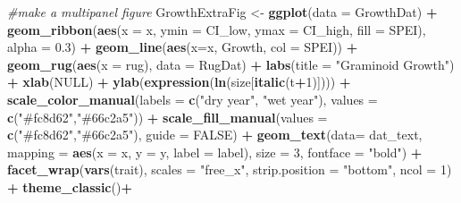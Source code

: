 \documentclass[
]{article}
\newenvironment{Shaded}{\begin{snugshade}}{\end{snugshade}}
\newcommand{\CommentTok}[1]{\textcolor[rgb]{0.56,0.35,0.01}{\textit{#1}}}
\newcommand{\DataTypeTok}[1]{\textcolor[rgb]{0.13,0.29,0.53}{#1}}
\newcommand{\DecValTok}[1]{\textcolor[rgb]{0.00,0.00,0.81}{#1}}
\newcommand{\FloatTok}[1]{\textcolor[rgb]{0.00,0.00,0.81}{#1}}
\newcommand{\KeywordTok}[1]{\textcolor[rgb]{0.13,0.29,0.53}{\textbf{#1}}}
\newcommand{\NormalTok}[1]{#1}
\newcommand{\OperatorTok}[1]{\textcolor[rgb]{0.81,0.36,0.00}{\textbf{#1}}}
\newcommand{\OtherTok}[1]{\textcolor[rgb]{0.56,0.35,0.01}{#1}}
\newcommand{\StringTok}[1]{\textcolor[rgb]{0.31,0.60,0.02}{#1}}
\begin{document}
\begin{Shaded}
\begin{Highlighting}[]
\CommentTok{\#make a multipanel figure}
\NormalTok{GrowthExtraFig \textless{}{-}}\StringTok{ }\KeywordTok{ggplot}\NormalTok{(}\DataTypeTok{data =}\NormalTok{ GrowthDat) }\OperatorTok{+}
\StringTok{  }\KeywordTok{geom\_ribbon}\NormalTok{(}\KeywordTok{aes}\NormalTok{(}\DataTypeTok{x =}\NormalTok{ x, }\DataTypeTok{ymin =}\NormalTok{ CI\_low, }\DataTypeTok{ymax =}\NormalTok{ CI\_high, }\DataTypeTok{fill =}\NormalTok{ SPEI), }\DataTypeTok{alpha =} \FloatTok{0.3}\NormalTok{) }\OperatorTok{+}
\StringTok{  }\KeywordTok{geom\_line}\NormalTok{(}\KeywordTok{aes}\NormalTok{(}\DataTypeTok{x=}\NormalTok{x, Growth, }\DataTypeTok{col =}\NormalTok{ SPEI))  }\OperatorTok{+}\StringTok{ }
\StringTok{  }\KeywordTok{geom\_rug}\NormalTok{(}\KeywordTok{aes}\NormalTok{(}\DataTypeTok{x =}\NormalTok{ rug), }\DataTypeTok{data =}\NormalTok{ RugDat) }\OperatorTok{+}
\StringTok{  }\KeywordTok{labs}\NormalTok{(}\DataTypeTok{title =} \StringTok{"Graminoid Growth"}\NormalTok{) }\OperatorTok{+}
\StringTok{  }\KeywordTok{xlab}\NormalTok{(}\OtherTok{NULL}\NormalTok{) }\OperatorTok{+}
\StringTok{  }\KeywordTok{ylab}\NormalTok{(}\KeywordTok{expression}\NormalTok{(}\KeywordTok{ln}\NormalTok{(size[}\KeywordTok{italic}\NormalTok{(t}\OperatorTok{+}\DecValTok{1}\NormalTok{)])))  }\OperatorTok{+}
\StringTok{  }\KeywordTok{scale\_color\_manual}\NormalTok{(}\DataTypeTok{labels =} \KeywordTok{c}\NormalTok{(}\StringTok{"dry year"}\NormalTok{, }\StringTok{"wet year"}\NormalTok{), }\DataTypeTok{values =} \KeywordTok{c}\NormalTok{(}\StringTok{"\#fc8d62"}\NormalTok{,}\StringTok{"\#66c2a5"}\NormalTok{)) }\OperatorTok{+}
\StringTok{  }\KeywordTok{scale\_fill\_manual}\NormalTok{(}\DataTypeTok{values =} \KeywordTok{c}\NormalTok{(}\StringTok{"\#fc8d62"}\NormalTok{,}\StringTok{"\#66c2a5"}\NormalTok{), }\DataTypeTok{guide =} \OtherTok{FALSE}\NormalTok{) }\OperatorTok{+}
\StringTok{  }\KeywordTok{geom\_text}\NormalTok{(}\DataTypeTok{data=}\NormalTok{ dat\_text, }\DataTypeTok{mapping =} \KeywordTok{aes}\NormalTok{(}\DataTypeTok{x =}\NormalTok{ x, }\DataTypeTok{y =}\NormalTok{ y, }\DataTypeTok{label =}\NormalTok{ label), }\DataTypeTok{size =} \DecValTok{3}\NormalTok{, }\DataTypeTok{fontface =} \StringTok{"bold"}\NormalTok{) }\OperatorTok{+}
\StringTok{    }\KeywordTok{facet\_wrap}\NormalTok{(}\KeywordTok{vars}\NormalTok{(trait), }\DataTypeTok{scales =} \StringTok{"free\_x"}\NormalTok{, }\DataTypeTok{strip.position =}  \StringTok{"bottom"}\NormalTok{, }\DataTypeTok{ncol =} \DecValTok{1}\NormalTok{) }\OperatorTok{+}
\StringTok{  }\KeywordTok{theme\_classic}\NormalTok{()}\OperatorTok{+}

\end{Highlighting}
\end{Shaded}
\end{document}
